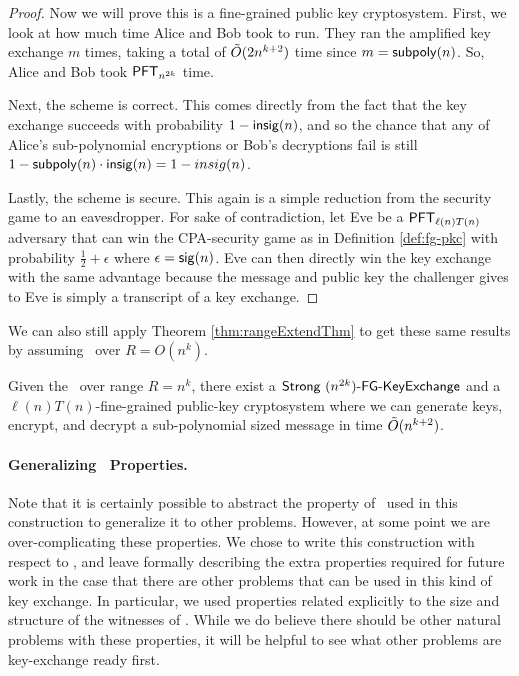 \begin{proof}
	Now we will prove this is a fine-grained public key cryptosystem. First, we look at how much time Alice and Bob took to run. They ran the amplified key exchange $m$ times, taking a total of $\~O(2n^{k+2})$ time since $m = \subpoly(n)$. So, Alice and Bob took $\PFT{n^{2k}}$ time.

	Next, the scheme is correct. This comes directly from the fact that the key exchange succeeds with probability $1 - \insig(n)$, and so the chance that any of Alice's sub-polynomial encryptions or Bob's decryptions fail is still $1 - \subpoly(n) \cdot \insig(n) = 1 - insig(n)$.
	
	Lastly, the scheme is secure. This again is a simple reduction from the security game to an eavesdropper. For sake of contradiction, let Eve be a $\PFT{\ell(n)T(n)}$ adversary that can win the CPA-security game as in Definition \ref{def:fg-pkc} with probability $\frac 1 2 + \epsilon$ where $\epsilon = \sig(n)$. Eve can then directly win the key exchange with the same advantage because the message and public key the challenger gives to Eve is simply a transcript of a key exchange.
\end{proof}

We can also still apply Theorem \ref{thm:rangeExtendThm} to get these same results by assuming \strongzkc~over $R = O(n^k)$.

\begin{corollary}
	Given the \strongzkc~over range $R = n^k$, there exist a $\strongfgkeyxc{n^{2k}}$ and a $\ell(n)T(n)$-fine-grained public-key cryptosystem where we can generate keys, encrypt, and decrypt a sub-polynomial sized message in time $\~O(n^{k+2})$.
\end{corollary}

\paragraph{Generalizing \zkclique~Properties.}
Note that it is certainly possible to abstract the property of \zkclique~used in this construction to generalize it to other problems. However, at some point we are over-complicating these properties. We chose to write this construction with respect to \zkclique, and leave formally describing the extra properties required for future work in the case that there are other problems that can be used in this kind of key exchange. In particular, we used properties related explicitly to the size and structure of the witnesses of \zkclique. While we do believe there should be other natural problems with these properties, it will be helpful to see what other problems are key-exchange ready first.